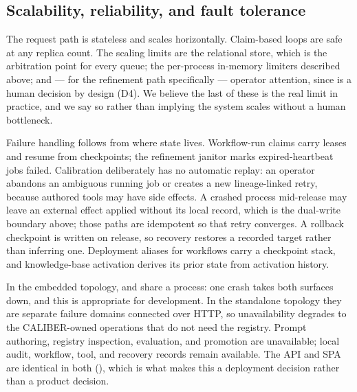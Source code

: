 \subsection{Scalability, reliability, and fault tolerance}

 The request path is stateless and scales horizontally.
Claim-based loops are safe at any replica count. The scaling limits are the
relational store, which is the arbitration point for every queue; the per-process
in-memory limiters described above; and --- for the refinement path specifically ---
operator attention, since  is a human decision by design (D4). We
believe the last of these is the real limit in practice, and we say so rather than
implying the system scales without a human bottleneck.

 Failure handling follows from where state lives. Workflow-run
claims carry leases and resume from checkpoints; the refinement janitor marks
expired-heartbeat jobs failed. Calibration deliberately has no automatic replay:
an operator abandons an ambiguous running job or creates a new lineage-linked
retry, because authored tools may have side effects. A crashed process mid-release may leave an
external effect applied without its local record, which is the dual-write boundary
above; those paths are idempotent so that retry converges. A rollback checkpoint is
written on release, so recovery restores a recorded target rather than inferring
one. Deployment aliases for workflows carry a checkpoint stack, and knowledge-base
activation derives its prior state from activation history.



 In the embedded topology, \sys and
\mlflow{} share a process: one crash takes both surfaces down, and this is
appropriate for development. In the standalone topology they are separate failure
domains connected over HTTP, so \mlflow{} unavailability degrades \sys to the
CALIBER-owned operations that do not need the registry. Prompt authoring,
registry inspection, evaluation, and promotion are unavailable; local audit,
workflow, tool, and recovery records remain available. The API and SPA are identical in
both (), which is what makes this a deployment decision
rather than a product decision.
